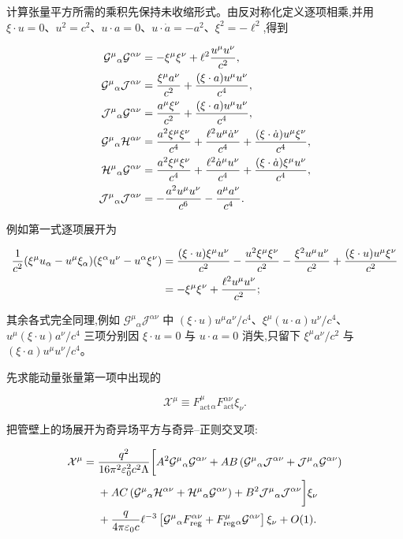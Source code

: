 计算张量平方所需的乘积先保持未收缩形式。由反对称化定义逐项相乘,并用 $\xi\cdot u=0$、$u^2=c^2$、$u\cdot a=0$、$u\cdot\dot a=-a^2$、$\xi^2=-\ell^2$,得到

\begin{align*}
 \mathcal G^\mu{}_\alpha\mathcal G^{\alpha\nu}
 &=-\xi^\mu\xi^\nu+\ell^2{u^\mu u^\nu\over c^2},\\
 \mathcal G^\mu{}_\alpha\mathcal J^{\alpha\nu}
 &={\xi^\mu a^\nu\over c^2}+{(\xi\cdot a)u^\mu u^\nu\over c^4},\\
 \mathcal J^\mu{}_\alpha\mathcal G^{\alpha\nu}
 &={a^\mu\xi^\nu\over c^2}+{(\xi\cdot a)u^\mu u^\nu\over c^4},\\
 \mathcal G^\mu{}_\alpha\mathcal H^{\alpha\nu}
 &={a^2\xi^\mu\xi^\nu\over c^4}
 +{\ell^2u^\mu\dot a^\nu\over c^4}
 +{(\xi\cdot\dot a)u^\mu\xi^\nu\over c^4},\\
 \mathcal H^\mu{}_\alpha\mathcal G^{\alpha\nu}
 &={a^2\xi^\mu\xi^\nu\over c^4}
 +{\ell^2\dot a^\mu u^\nu\over c^4}
 +{(\xi\cdot\dot a)\xi^\mu u^\nu\over c^4},\\
 \mathcal J^\mu{}_\alpha\mathcal J^{\alpha\nu}
 &=-{a^2u^\mu u^\nu\over c^6}-{a^\mu a^\nu\over c^4}.
\end{align*}

例如第一式逐项展开为

\begin{align*}
 {1\over c^2}(\xi^\mu u_\alpha-u^\mu\xi_\alpha)
 (\xi^\alpha u^\nu-u^\alpha\xi^\nu)
 &={(\xi\cdot u)\xi^\mu u^\nu\over c^2}
 -{u^2\xi^\mu\xi^\nu\over c^2}
 -{\xi^2u^\mu u^\nu\over c^2}
 +{(\xi\cdot u)u^\mu\xi^\nu\over c^2}\\
 &=-\xi^\mu\xi^\nu+{\ell^2u^\mu u^\nu\over c^2};
\end{align*}

其余各式完全同理,例如 $\mathcal G^\mu{}_\alpha\mathcal J^{\alpha\nu}$ 中 $(\xi\cdot u)u^\mu a^\nu/c^4$、$\xi^\mu(u\cdot a)u^\nu/c^4$、$u^\mu(\xi\cdot u)a^\nu/c^4$ 三项分别因 $\xi\cdot u=0$ 与 $u\cdot a=0$ 消失,只留下 $\xi^\mu a^\nu/c^2$ 与 $(\xi\cdot a)u^\mu u^\nu/c^4$。

先求能动量张量第一项中出现的

\begin{equation*}
 \mathcal X^\mu
 \equiv F_{\mathrm{act}}^\mu{}_\alpha
 F_{\mathrm{act}}^{\alpha\nu}\xi_\nu.
\end{equation*}

把管壁上的场展开为奇异场平方与奇异--正则交叉项:

\begin{align*}
 \mathcal X^\mu
 ={}&{q^2\over16\pi^2\varepsilon_0^2c^2\Lambda}
 \bigg[
 A^2\mathcal G^\mu{}_\alpha\mathcal G^{\alpha\nu}
 +AB\left(
 \mathcal G^\mu{}_\alpha\mathcal J^{\alpha\nu}
 +\mathcal J^\mu{}_\alpha\mathcal G^{\alpha\nu}
 \right)\\
 &+AC\left(
 \mathcal G^\mu{}_\alpha\mathcal H^{\alpha\nu}
 +\mathcal H^\mu{}_\alpha\mathcal G^{\alpha\nu}
 \right)
 +B^2\mathcal J^\mu{}_\alpha\mathcal J^{\alpha\nu}
 \bigg]\xi_\nu\\
 &+{q\over4\pi\varepsilon_0c}\ell^{-3}
 \left[
 \mathcal G^\mu{}_\alpha F_{\mathrm{reg}}^{\alpha\nu}
 +F_{\mathrm{reg}}^\mu{}_\alpha\mathcal G^{\alpha\nu}
 \right]\xi_\nu
 +O(1).
\end{align*}

